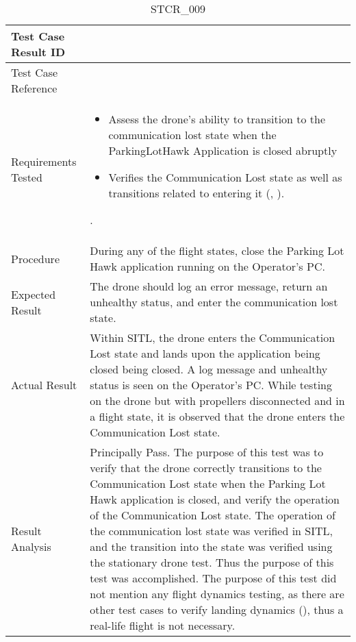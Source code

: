 \documentclass[12pt, titlepage]{article}
\begin{document}
\begin{table}[!h]
\begin{center}
\caption {STCR\_009}
\label{tab:STCR_009}
\begin{tabular}{ | m{3.2cm} | m{12.2cm} | } 
\hline
Test Case Result ID & \nameref{tab:STCR_009} \\ 
\hline
Test Case Reference & \nameref{tab:STC_009}  \\ 
\hline
Requirements Tested & 
\begin{itemize}
    \item Assess the drone's ability to transition to the communication lost state when the ParkingLotHawk Application is closed abruptly
    \item Verifies the Communication Lost state as well as transitions related to entering it (\nameref{STA_010}, \nameref{TRANS_010}).  
\end{itemize}.
\\  
\hline
Procedure & During any of the flight states, close the Parking Lot Hawk application running on the Operator's PC.     \\ 
\hline
Expected Result & The drone should log an error message, return an unhealthy status, and enter the communication lost state.   \\ 
\hline
Actual Result & Within SITL, the drone enters the Communication Lost state and lands upon the application being closed being closed. A log message and unhealthy status is seen on the Operator's PC. While testing on the drone but with propellers disconnected and in a flight state, it is observed that the drone enters the Communication Lost state.  \\ 
\hline
Result Analysis & Principally Pass. The purpose of this test was to verify that the drone correctly transitions to the Communication Lost state when the Parking Lot Hawk application is closed, and verify the operation of the Communication Lost state. The operation of the communication lost state was verified in SITL, and the transition into the state was verified using the stationary drone test. Thus the purpose of this test was accomplished. The purpose of this test did not mention any flight dynamics testing, as there are other test cases to verify landing dynamics (\nameref{tab:STCR_003}), thus a real-life flight is not necessary.   \\ 
\hline
\end{tabular}
\end{center}
\end{table}
\end{document}
